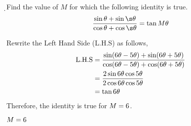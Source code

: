 

\ADD\va\vb\s
\SUBTRACT\va\vb\d

\question[3] Find the value of $M$ for which the following identity is true.
\begin{align}
  \dfrac{\sin\theta+\sin \s\theta}{\cos\theta+\cos \s\theta} 
    = \tan M\theta \nonumber
\end{align}

\watchout

\begin{solution}[\halfpage]
  Rewrite the Left Hand Side (L.H.S) as follows,
  \begin{align}
    \text{L.H.S} &= \dfrac{\sin(6\theta-5\theta)+\sin(6\theta+5\theta)}
                      {\cos(6\theta-5\theta)+\cos(6\theta+5\theta)} \\
                 &= \dfrac{2\sin 6\theta\cos 5\theta}
                      {2\cos 6\theta\cos 5\theta} \\
                 &= \tan 6\theta
  \end{align}
  Therefore, the identity is true for $M=6$.
\end{solution}

\ifprintanswers\begin{codex}$M=6$\end{codex}\fi
